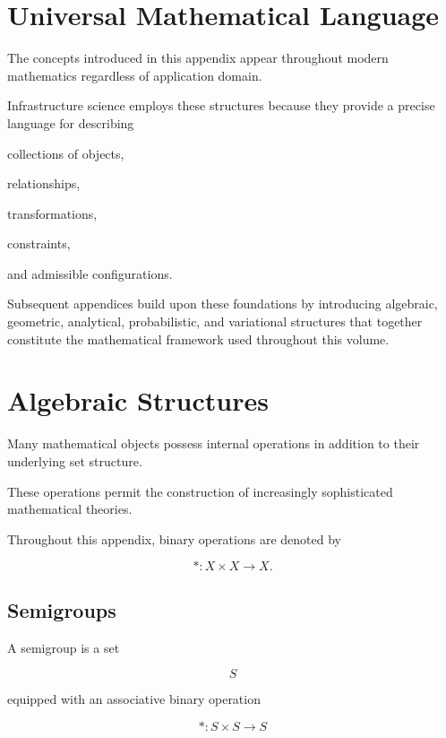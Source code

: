 \documentclass[11pt,fleqn]{book}
\numberwithin{equation}{chapter}
\theoremstyle{plain}
\theoremstyle{definition}
\theoremstyle{remark}
\begin{document}

\section{Universal Mathematical Language}

The concepts introduced in this appendix appear throughout modern
mathematics regardless of application domain.

Infrastructure science employs these structures because they provide a
precise language for describing

collections of objects,

relationships,

transformations,

constraints,

and admissible configurations.

Subsequent appendices build upon these foundations by introducing
algebraic, geometric, analytical, probabilistic, and variational
structures that together constitute the mathematical framework used
throughout this volume.


\section{Algebraic Structures}

Many mathematical objects possess internal operations in addition to
their underlying set structure.

These operations permit the construction of increasingly sophisticated
mathematical theories.

Throughout this appendix, binary operations are denoted by

\[
*:X\times X\rightarrow X.
\]


\subsection{Semigroups}

A semigroup is a set

\[
S
\]

equipped with an associative binary operation

\[
*:S\times S\rightarrow S
\]
\end{document}
